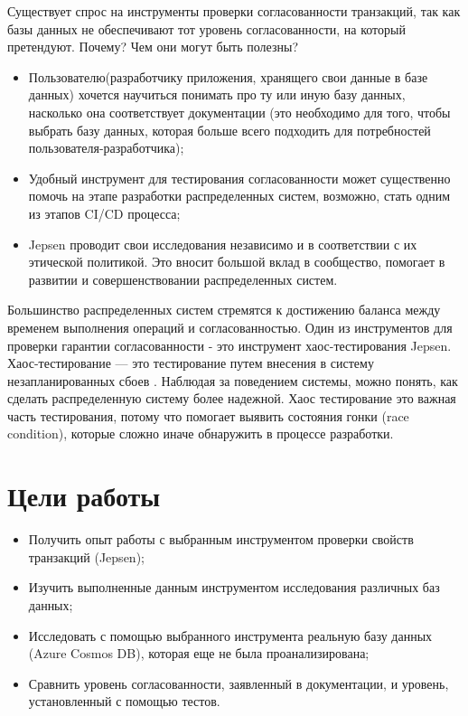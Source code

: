 \documentclass[12pt,  openany]{book}
\begin{document}
Существует спрос на инструменты проверки согласованности транзакций, так  как базы данных не обеспечивают тот уровень согласованности, на который претендуют.  Почему? Чем они могут быть полезны?
\begin{itemize}
\item Пользователю(разработчику приложения, хранящего свои данные в базе данных) хочется научиться понимать про ту или иную базу данных, насколько она соответствует документации (это необходимо для того, чтобы выбрать базу данных, которая больше всего подходить для потребностей пользователя-разработчика);
\item Удобный инструмент для тестирования согласованности может существенно помочь на этапе разработки распределенных систем, возможно, стать одним из этапов CI/CD процесса;
\item Jepsen проводит свои исследования независимо и в соответствии с их этической политикой. Это вносит большой вклад в сообщество, помогает в развитии и совершенствовании распределенных систем.
\end{itemize}
Большинство распределенных систем стремятся к достижению баланса между временем выполнения операций и согласованностью.  Один из инструментов для проверки гарантии согласованности - это инструмент хаос-тестирования Jepsen.  Хаос-тестирование ---  это тестирование путем внесения в систему незапланированных сбоев \cite{chaosTesting}.  Наблюдая за поведением системы, можно понять, как сделать распределенную систему более надежной. Хаос тестирование это важная часть тестирования, потому что помогает выявить состояния гонки (race condition), которые сложно иначе обнаружить в процессе разработки.

\section{Цели работы}
\begin{itemize}
  \item Получить опыт работы с выбранным инструментом проверки свойств транзакций (Jepsen);
  \item Изучить выполненные данным инструментом исследования различных баз данных;
  \item Исследовать с помощью выбранного инструмента реальную базу данных (Azure Cosmos DB), которая еще не была проанализирована;
  \item Сравнить уровень согласованности, заявленный в документации, и уровень, установленный с помощью тестов.
\end{itemize}
\end{document}
